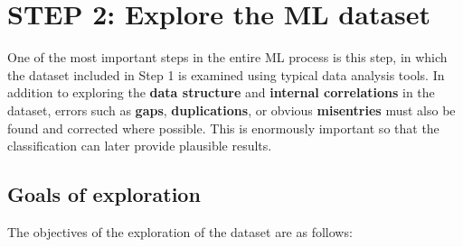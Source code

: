 \documentclass [oneside,10pt,a4paper,ngerman,BCOR10mm,headsepline,parindent,final]{scrartcl}
\begin{document}
    \hypertarget{step-2-explore-the-ml-dataset}{%
\section{STEP 2: Explore the ML
dataset}\label{step-2-explore-the-ml-dataset}}

One of the most important steps in the entire ML process is this step,
in which the dataset included in Step 1 is examined using typical data
analysis tools. In addition to exploring the \textbf{data structure} and
\textbf{internal correlations} in the dataset, errors such as
\textbf{gaps}, \textbf{duplications}, or obvious \textbf{misentries}
must also be found and corrected where possible. This is enormously
important so that the classification can later provide plausible
results.

\hypertarget{goals-of-exploration}{%
\subsection{Goals of exploration}\label{goals-of-exploration}}

The objectives of the exploration of the dataset are as follows:
\end{document}

